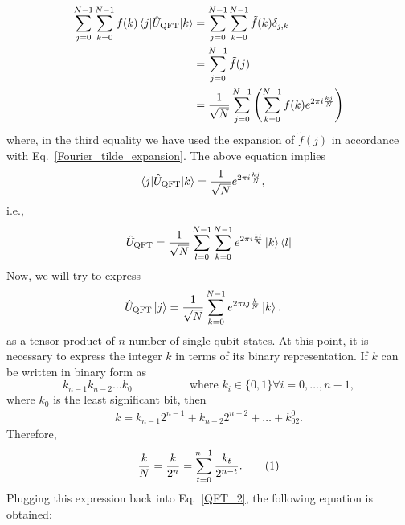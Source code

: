 \documentclass[12pt,oneside]{book}
\newcommand\numberthis{\addtocounter{equation}{1}\tag{\theequation}}
\begin{document}
\begin{align*}
    \sum_{j=0}^{N-1}\sum_{k=0}^{N-1} f(k)\braket{j|\hat{U}_\mathrm{QFT}|k} &{}=  \sum_{j=0}^{N-1}\sum_{k=0}^{N-1} \tilde{f}(k)\delta_{j,k}\\
    &{}=\sum_{j=0}^{N-1}\tilde{f}(j)\\
    &{}=\frac{1}{\sqrt{N}} \sum_{j=0}^{N-1}\left(\sum_{k=0}^{N-1} f(k) e^{2\pi i \frac{kj}{N}}\right)
\end{align*}
where, in the third equality we have used the expansion of $\tilde{f}(j)$ in accordance with Eq.~\ref{Fourier_tilde_expansion}. The above equation implies
\begin{align*}
    \braket{j|\hat{U}_\mathrm{QFT}|k} &{}= \frac{1}{\sqrt{N}} e^{2\pi i \frac{kj}{N}},
\end{align*}
i.e.,
\begin{align*}
    \hat{U}_\mathrm{QFT} = \frac{1}{\sqrt{N}} \sum_{l=0}^{N-1}\sum_{k=0}^{N-1} e^{2\pi i \frac{kl}{N}} \ket{k}\bra{l}
\end{align*}
Now, we will try to express
\begin{align}\label{QFT_2}
    \hat{U}_\mathrm{QFT}\ket{j} &{}=\frac{1}{\sqrt{N}} \sum_{k=0}^{N-1}e^{2\pi ij\frac{k}{N}}\ket{k}.
\end{align}
as a tensor-product of $n$ number of single-qubit states. At this point, it is necessary to express the integer $k$ in terms of its binary representation. If $k$ can be written in binary form as $$k_{n-1}k_{n-2}\hdots k_0 \hspace{2cm} \textrm{ where } k_i \in \{0,1\} \forall i=0,\hdots,n-1,$$
where $k_0$ is the least significant bit, then
\begin{align*}
    k=k_{n-1}2^{n-1}+k_{n-2}2^{n-2}+\hdots+k_02^0.
\end{align*}
Therefore,
\begin{align*}\label{EqBinaryExpansion}
    \frac{k}{N}=\frac{k}{2^n} = \sum_{t=0}^{n-1} \frac{k_t}{2^{n-t}}.\numberthis
\end{align*}
Plugging this expression back into Eq.~\ref{QFT_2}, the following equation is obtained:
\end{document}
